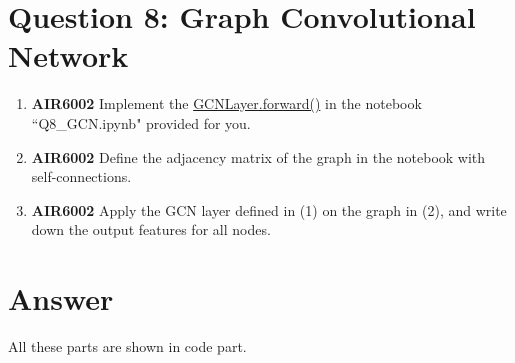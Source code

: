 \documentclass[
	12pt, %
]{fphw}
\begin{document}
\section*{Question 8: Graph Convolutional Network}

\begin{problem}
	\begin{enumerate}
		\item \textbf{AIR6002} Implement the \url{GCNLayer.forward()} in the notebook ``Q8\_GCN.ipynb" provided for you. 
	
		\item \textbf{AIR6002} Define the adjacency matrix of the graph in the notebook with self-connections.  

	
		\item \textbf{AIR6002} Apply the GCN layer defined in (1) on the graph in (2), and write down the output features for all nodes. 
	\end{enumerate}
\end{problem}
\section*{Answer}

All these parts are shown in code part.








\end{document}
